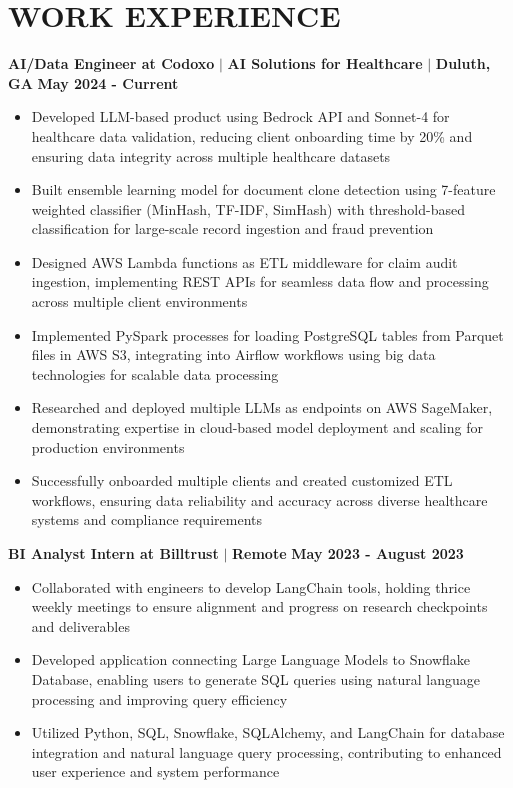 \documentclass[10pt,a4paper]{article}
\newcommand{\jobtitle}[1]{\noindent\textbf{#1}}
\begin{document}
\section*{WORK EXPERIENCE}
\jobtitle{AI/Data Engineer at Codoxo} $|$ \textbf{AI Solutions for Healthcare} $|$ \textbf{Duluth, GA} \hfill \textbf{May 2024 - Current}
\begin{itemize}
    \item Developed LLM-based product using Bedrock API and Sonnet-4 for healthcare data validation, reducing client onboarding time by 20\% and ensuring data integrity across multiple healthcare datasets
    \item Built ensemble learning model for document clone detection using 7-feature weighted classifier (MinHash, TF-IDF, SimHash) with threshold-based classification for large-scale record ingestion and fraud prevention
    \item Designed AWS Lambda functions as ETL middleware for claim audit ingestion, implementing REST APIs for seamless data flow and processing across multiple client environments
    \item Implemented PySpark processes for loading PostgreSQL tables from Parquet files in AWS S3, integrating into Airflow workflows using big data technologies for scalable data processing
    \item Researched and deployed multiple LLMs as endpoints on AWS SageMaker, demonstrating expertise in cloud-based model deployment and scaling for production environments
    \item Successfully onboarded multiple clients and created customized ETL workflows, ensuring data reliability and accuracy across diverse healthcare systems and compliance requirements
\end{itemize}

\jobtitle{BI Analyst Intern at Billtrust} $|$ \textbf{Remote} \hfill \textbf{May 2023 - August 2023}
\begin{itemize}
    \item Collaborated with engineers to develop LangChain tools, holding thrice weekly meetings to ensure alignment and progress on research checkpoints and deliverables
    \item Developed application connecting Large Language Models to Snowflake Database, enabling users to generate SQL queries using natural language processing and improving query efficiency
    \item Utilized Python, SQL, Snowflake, SQLAlchemy, and LangChain for database integration and natural language query processing, contributing to enhanced user experience and system performance
\end{itemize}
\end{document}
